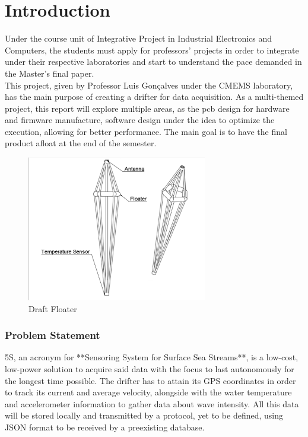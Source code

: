 \chapter{Introduction}
\label{sec:Introduction}

Under the course unit of Integrative Project in Industrial Electronics and Computers, the students must
apply for professors' projects in order to integrate under their respective laboratories and start to understand the pace
demanded in the Master's final paper.\\

This project, given by Professor Luis Gonçalves under the CMEMS laboratory,
has the main purpose of creating a drifter for data acquisition. As a multi-themed project, this report will
explore multiple areas, as the \acrlong{pcb} design for hardware and firmware manufacture, software design under the idea to optimize
the execution, allowing for better performance. The main goal is to have the final product afloat at the end of the semester.\\



\begin{figure}[H]
    \centering
    \includegraphics[width=0.7\textwidth]{images/diagrams/shell/unnamed.png}
    \caption{Draft Floater}
    \label{fig:DraftFloater}        
\end{figure}

\subsection{Problem Statement}
\label{sec:ProblemStatement}

5S, an acronym for **Sensoring System for Surface Sea Streams**, is a low-cost, low-power solution to acquire
said data with the focus to last autonomously for the longest time possible. The drifter has to attain its GPS
coordinates in order to track its current and average velocity, alongside with the water temperature and accelerometer 
information to gather data about wave intensity. All this data will be stored locally and transmitted by a protocol,
yet to be defined, using JSON format to be received by a preexisting database.  

